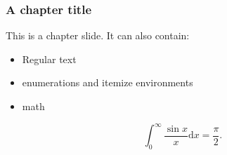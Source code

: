 \documentclass[t,aspectratio=169]{beamer}
\begin{document}
\begin{chapterframe}
  \frametitle{A chapter title}
  
  This is a chapter slide. It can also contain:
  \begin{itemize}
    \item Regular text
    \item enumerations and itemize environments
    \item math
  \end{itemize}
  \[
    \int_0^\infty \frac{\sin x}{x} \text{d}x=\frac{\pi}{2}.
  \]
\end{chapterframe}
\end{document}

